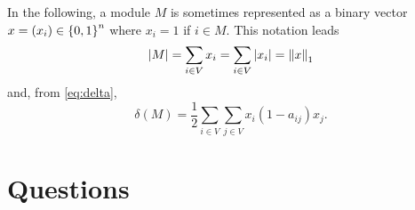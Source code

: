 \documentclass[a4paper, 12pt]{article}
\begin{document}
    In the following, a module $M$ is sometimes represented as a binary vector $x = (x_i) \in \left\{0, 1\right\}^n$ where $x_i = 1$ if $i \in M$. This notation leads
    \begin{equation}
        \left|M\right| = \sum_{i \in V} x_i = \sum_{i \in V} \left|x_i\right| = \left\|x\right\|_1
    \end{equation}
    and, from \eqref{eq:delta},
    \begin{equation}
        \delta(M) = \frac{1}{2} \sum_{i \in V} \sum_{j \in V} x_i (1 - a_{ij}) x_j .
    \end{equation}
    
    \newpage
    
    \section*{Questions}
    
\end{document}
